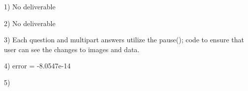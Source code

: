 \documentclass[a4paper, 12pt]{article}
\begin{document}
1)  
No deliverable

2) 
No deliverable

3)  
Each question and multipart answers utilize the pause(); code to ensure that user can see the changes to images and data.

4) 
error = -8.0547e-14

5)
\end{document}
